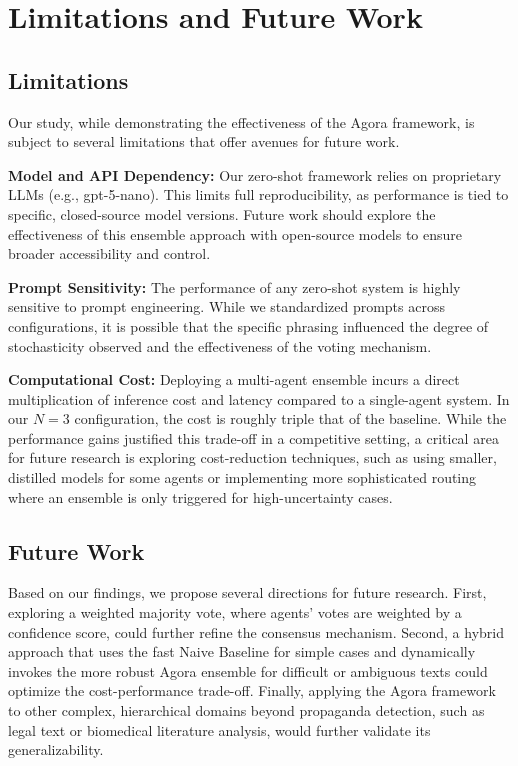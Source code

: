 \section{Limitations and Future Work}

\subsection{Limitations}

Our study, while demonstrating the effectiveness of the Agora framework, is subject to several limitations that offer avenues for future work.

\textbf{Model and API Dependency:} Our zero-shot framework relies on proprietary LLMs (e.g., gpt-5-nano). This limits full reproducibility, as performance is tied to specific, closed-source model versions. Future work should explore the effectiveness of this ensemble approach with open-source models to ensure broader accessibility and control.

\textbf{Prompt Sensitivity:} The performance of any zero-shot system is highly sensitive to prompt engineering. While we standardized prompts across configurations, it is possible that the specific phrasing influenced the degree of stochasticity observed and the effectiveness of the voting mechanism.

\textbf{Computational Cost:} Deploying a multi-agent ensemble incurs a direct multiplication of inference cost and latency compared to a single-agent system. In our $N=3$ configuration, the cost is roughly triple that of the baseline. While the performance gains justified this trade-off in a competitive setting, a critical area for future research is exploring cost-reduction techniques, such as using smaller, distilled models for some agents or implementing more sophisticated routing where an ensemble is only triggered for high-uncertainty cases.

\subsection{Future Work}

Based on our findings, we propose several directions for future research. First, exploring a weighted majority vote, where agents' votes are weighted by a confidence score, could further refine the consensus mechanism. Second, a hybrid approach that uses the fast Naive Baseline for simple cases and dynamically invokes the more robust Agora ensemble for difficult or ambiguous texts could optimize the cost-performance trade-off. Finally, applying the Agora framework to other complex, hierarchical domains beyond propaganda detection, such as legal text or biomedical literature analysis, would further validate its generalizability.

